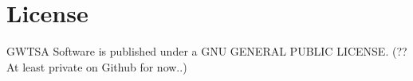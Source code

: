 \chapter{License}
GWTSA Software is published under a GNU GENERAL PUBLIC LICENSE. (?? At least private on Github for now..)